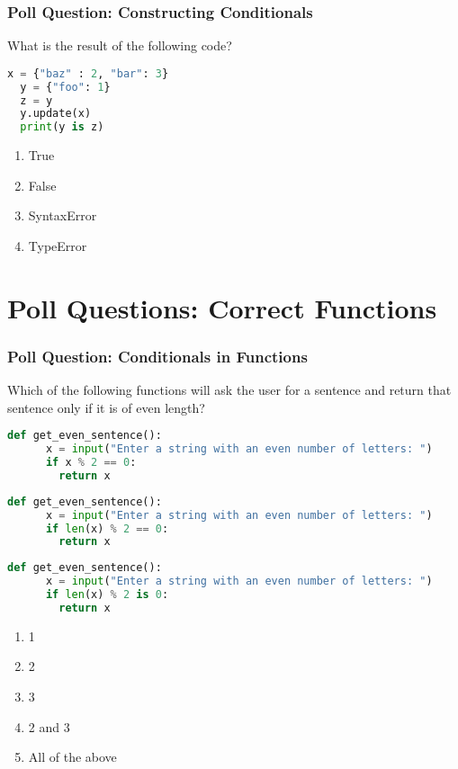 \documentclass{beamer}
\begin{document}
%
%
\begin{frame}[fragile]
	\frametitle{Poll Question: Constructing Conditionals}
  What is the result of the following code?
  \begin{lstlisting}[language=Python, autogobble,basicstyle=\tiny,numbers=none]
  x = {"baz" : 2, "bar": 3}
  y = {"foo": 1}
  z = y
  y.update(x)
  print(y is z)
  \end{lstlisting}
  \vfill
  \begin{enumerate}[A]
    \item True
    \item False
    \item SyntaxError
    \item TypeError
  \end{enumerate}
\end{frame}

\section{Poll Questions: Correct Functions}

%
%
\begin{frame}[fragile]
	\frametitle{Poll Question: Conditionals in Functions}
  Which of the following functions will ask the user for a sentence and return that sentence only if it is of even length?
	\vfill
	\begin{minipage}{0.32\textwidth}
		\begin{lstlisting}[language=Python, autogobble,basicstyle=\tiny,numbers=none]
    def get_even_sentence():
      x = input("Enter a string with an even number of letters: ")
      if x % 2 == 0:
        return x
		\end{lstlisting}
	\end{minipage}
	\begin{minipage}{0.32\textwidth}
		\begin{lstlisting}[language=Python, autogobble,basicstyle=\tiny,numbers=none]
    def get_even_sentence():
      x = input("Enter a string with an even number of letters: ")
      if len(x) % 2 == 0:
        return x
		\end{lstlisting}
	\end{minipage}
	\begin{minipage}{0.32\textwidth}
		\begin{lstlisting}[language=Python, autogobble,basicstyle=\tiny,numbers=none]
    def get_even_sentence():
      x = input("Enter a string with an even number of letters: ")
      if len(x) % 2 is 0:
        return x
		\end{lstlisting}
	\end{minipage}
	\vfill
	\begin{enumerate}[A]
    \item 1
    \item 2
    \item 3
    \item 2 and 3
    \item All of the above
	\end{enumerate}
\end{frame}
\end{document}
